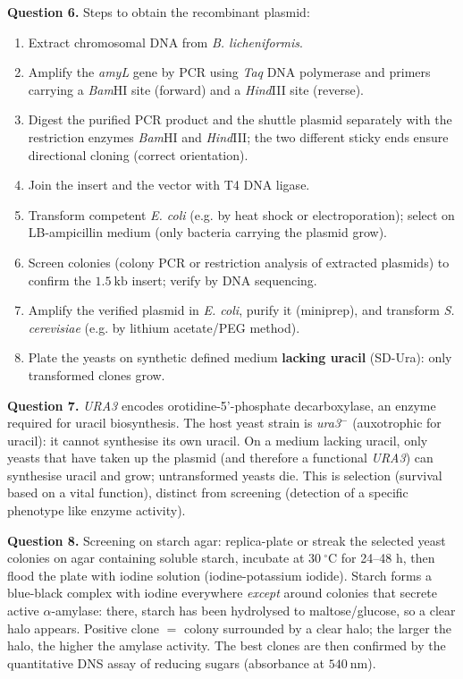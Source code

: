 \documentclass[11pt]{article}
\newcommand{\cle}[1]{{\popxbold\color{popdark}#1}}
\begin{document}
\textbf{Question 6.} Steps to obtain the recombinant plasmid:
\begin{enumerate}
\item Extract chromosomal DNA from \emph{B. licheniformis}.
\item Amplify the \emph{amyL} gene by \cle{PCR} using \emph{Taq} DNA polymerase and primers carrying a \emph{Bam}HI site (forward) and a \emph{Hind}III site (reverse).
\item Digest the purified PCR product and the shuttle plasmid separately with the \cle{restriction enzymes} \emph{Bam}HI and \emph{Hind}III; the two different sticky ends ensure directional cloning (correct orientation).
\item Join the insert and the vector with \cle{T4 DNA ligase}.
\item Transform competent \emph{E. coli} (e.g. by heat shock or electroporation); select on LB-ampicillin medium (only bacteria carrying the plasmid grow).
\item Screen colonies (colony PCR or restriction analysis of extracted plasmids) to confirm the $1.5\ \mathrm{kb}$ insert; verify by DNA sequencing.
\item Amplify the verified plasmid in \emph{E. coli}, purify it (miniprep), and transform \emph{S. cerevisiae} (e.g. by lithium acetate/PEG method).
\item Plate the yeasts on synthetic defined medium \textbf{lacking uracil} (SD-Ura): only transformed clones grow.
\end{enumerate}

\textbf{Question 7.} \emph{URA3} encodes orotidine-5'-phosphate decarboxylase, an enzyme required for uracil biosynthesis. The host yeast strain is \emph{ura3}$^{-}$ (auxotrophic for uracil): it cannot synthesise its own uracil. On a medium lacking uracil, only yeasts that have taken up the plasmid (and therefore a functional \emph{URA3}) can synthesise uracil and grow; untransformed yeasts die. This is \cle{selection} (survival based on a vital function), distinct from \cle{screening} (detection of a specific phenotype like enzyme activity).

\textbf{Question 8.} Screening on starch agar: replica-plate or streak the selected yeast colonies on agar containing soluble starch, incubate at $30\ ^{\circ}\mathrm{C}$ for 24--48 h, then flood the plate with iodine solution (iodine-potassium iodide). Starch forms a blue-black complex with iodine everywhere \emph{except} around colonies that secrete active $\alpha$-amylase: there, starch has been hydrolysed to maltose/glucose, so a \cle{clear halo} appears. Positive clone $=$ colony surrounded by a clear halo; the larger the halo, the higher the amylase activity. The best clones are then confirmed by the quantitative DNS assay of reducing sugars (absorbance at $540\ \mathrm{nm}$).
\end{document}
